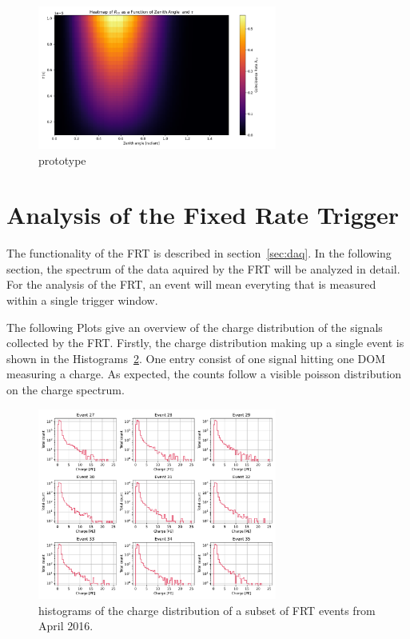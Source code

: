 \begin{figure}
    \centering
    \includegraphics[width=0.7\textwidth]{Plots/heatmap_zenith.png}
    \caption{prototype}
    \label{fig:heat_zenith}
\end{figure}


\section{Analysis of the Fixed Rate Trigger}

The functionality of the FRT is described in section~\ref{sec:daq}. In the following section, the spectrum of the data aquired by the FRT will be analyzed in 
detail. For the analysis of the FRT, an event will mean everyting that is measured within a single trigger window. 

The following Plots give an overview of the charge distribution of the signals collected by the FRT. Firstly, the charge distribution making up a 
single event is shown in the Histograms~\ref{fig:single_charge_hist}. One entry consist of one signal hitting one DOM measuring a charge.
As expected, the counts follow a visible poisson distribution on the charge spectrum. 

\begin{figure}
    \centering
    \includegraphics[width=0.7\textwidth]{Plots/single_charge_hist.pdf}
    \caption{histograms of the charge distribution of a subset of FRT events from April 2016.}
    \label{fig:single_charge_hist}
\end{figure}

